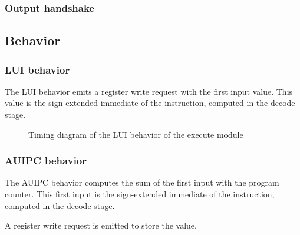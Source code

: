     \subsubsection{Output handshake}




  \subsection{Behavior}

    \subsubsection{LUI behavior}

      \begin{content}
          The LUI behavior emits a register write request with the first input value. This value is the sign-extended immediate of the instruction, computed in the decode stage.
        \end{content}

      \begin{figure}[H]
          \centering
          
          \caption{Timing diagram of the LUI behavior of the execute module}
          \label{fig:exm-behavior-lui}
        \end{figure}

    \subsubsection{AUIPC behavior}

      \begin{content}
          The AUIPC behavior computes the sum of the first input with the program counter. This first input is the sign-extended immediate of the instruction, computed in the decode stage.
          
          A register write request is emitted to store the value.
        \end{content}

